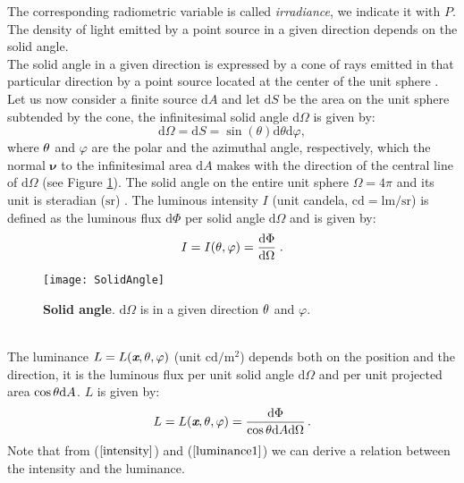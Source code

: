 The corresponding radiometric variable is called \textit{irradiance}, we indicate it with $P$. The density of light emitted by a point source in a given direction depends on the solid angle.\\ \indent
The solid angle in a given direction is expressed by a cone of rays emitted in that particular direction by a point source located at the center of the unit sphere \cite{koshel2012illumination}. Let us now consider a finite source $\textrm{d}A$ and let $\textrm{d}S$ be the area on the unit sphere subtended by the cone,
the infinitesimal solid angle $\textrm{d}\Omega$ is given by:
\begin{equation}\label{solid_angle}
\textrm{d}\Omega = \textrm{d}S= \sin(\theta)\textrm{d}\theta \textrm{d}\varphi,
\end{equation}
 where $\theta$ and $\varphi$ are the polar and the azimuthal angle, respectively, which the normal $\boldsymbol{\nu}$ to the infinitesimal area $\textrm{d}A$ makes with the direction of the central line of $\textrm{d}\Omega$ (see Figure \ref{fig:rad}).
The solid angle on the entire unit sphere $\Omega = 4\pi$ and its unit is steradian ($\textrm{sr}$) \cite{arecchi2007field}.
The luminous intensity $I$ (unit candela, $\textrm{cd}=\textrm{lm}/\textrm{sr}$) is defined as the luminous flux $\textrm{d}\Phi$ per solid angle
$\textrm{d}\Omega$ and is given by:
\begin{equation}\label{intensity}
I = I(\theta, \varphi) = \frac{\textrm{d}\Phi}{\textrm{d}\Omega}\;.
\end{equation}
 \begin{figure}[t]
  \begin{center}
  \texttt{[image: SolidAngle]}
  \end{center}
  \caption{\textbf{Solid angle}. $\textrm{d}\Omega$ is in a given direction $\theta$ and $\varphi$.}
  \label{fig:rad}
  \end{figure}
\\ \indent 
The luminance $L = L(\textit{\textbf{x}}, \theta, \varphi)$ (unit $\textrm{cd} / \textrm{m}^2$) depends both on the position and the direction, it is the luminous flux per unit solid angle $\textrm{d}\Omega$ and  per unit projected area $\cos\theta \textrm{d}A$.  $L$  is given by:
\begin{equation}\label{luminance1}
  L=L(\textit{\textbf{x}}, \theta, \varphi) = \frac{\textrm{d}\Phi}{\cos\theta\textrm{d}A\textrm{d}\Omega}\,.
\end{equation}
\noindent Note that from ($\ref{intensity}$) and ($\ref{luminance1}$) we can derive a relation between the intensity and the luminance. 
